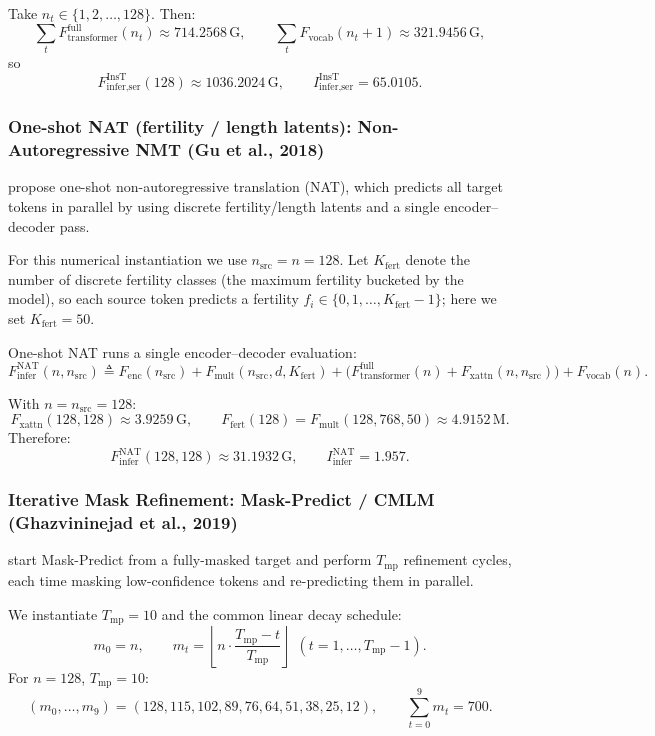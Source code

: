 \documentclass[11pt]{article}
\newcommand{\G}{\mathrm{G}} %
\newcommand{\M}{\mathrm{M}} %
\begin{document}
Take $n_t\in\{1,2,\dots,128\}$. Then:
\[
\sum_t F_{\text{transformer}}^{\text{full}}(n_t)\approx \num{714.2568}\,\G,\qquad
\sum_t F_{\text{vocab}}(n_t+1)\approx \num{321.9456}\,\G,
\]
so
\[
F_{\text{infer,ser}}^{\text{InsT}}(128)\approx \num{1036.2024}\,\G,\qquad
I_{\text{infer,ser}}^{\text{InsT}}=\num{65.0105}.
\]

\subsubsection{One-shot NAT (fertility / length latents): Non-Autoregressive NMT (Gu et al., 2018)}
\citet{gu2018nonautoregressive} propose one-shot non-autoregressive translation (NAT), which predicts all target tokens in parallel by using discrete fertility/length latents and a single encoder--decoder pass.

For this numerical instantiation we use $n_{\text{src}}=n=128$. Let $K_{\text{fert}}$ denote the number of discrete fertility classes (the maximum fertility bucketed by the model), so each source token predicts a fertility $f_i \in \{0,1,\dots,K_{\text{fert}}-1\}$; here we set $K_{\text{fert}}=50$.

One-shot NAT runs a single encoder--decoder evaluation:
\[
F_{\text{infer}}^{\text{NAT}}(n,n_{\text{src}})
\triangleq
F_{\text{enc}}(n_{\text{src}})
+F_{\text{mult}}(n_{\text{src}}, d, K_{\text{fert}})
+\Big(F_{\text{transformer}}^{\text{full}}(n)+F_{\text{xattn}}(n,n_{\text{src}})\Big)
+F_{\text{vocab}}(n).
\]

With $n=n_{\text{src}}=128$:
\[
F_{\text{xattn}}(128,128)\approx \num{3.9259}\,\G,
\qquad
F_{\text{fert}}(128)=F_{\text{mult}}(128,768,50)\approx \num{4.9152}\,\M.
\]
Therefore:
\[
F_{\text{infer}}^{\text{NAT}}(128,128)\approx \num{31.1932}\,\G,
\qquad
I_{\text{infer}}^{\text{NAT}}=\num{1.957}.
\]

\subsubsection{Iterative Mask Refinement: Mask-Predict / CMLM (Ghazvininejad et al., 2019)}
\citet{ghazvininejad2019maskpredict} start Mask-Predict from a fully-masked target and perform $T_{\text{mp}}$ refinement cycles, each time masking low-confidence tokens and re-predicting them in parallel.

We instantiate $T_{\text{mp}}=10$ and the common linear decay schedule:
\[
m_0=n,\qquad
m_t=\left\lfloor n\cdot\frac{T_{\text{mp}}-t}{T_{\text{mp}}}\right\rfloor \ \ (t=1,\dots,T_{\text{mp}}-1).
\]
For $n=128$, $T_{\text{mp}}=10$:
\[
(m_0,\dots,m_9)=(128,115,102,89,76,64,51,38,25,12),
\qquad
\sum_{t=0}^{9} m_t = 700.
\]
\end{document}
